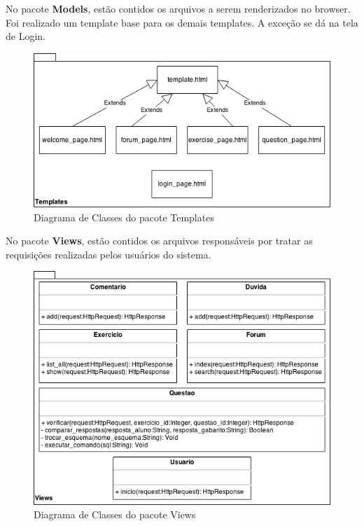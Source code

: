 \documentclass[graduacao,brazil]{ThesisPUC}
\begin{document}
No pacote \textbf{Models}, est\~{a}o contidos os arquivos a serem renderizados no browser.
Foi realizado um template base para os demais templates. A exce\c{c}\~{a}o se d\'{a}
na tela de Login.

\begin{figure}[H]
    \centering
    \includegraphics[width=\linewidth]{Imagens/DiagramaDeClasseTemplates.png}
    \caption{Diagrama de Classes do pacote Templates}
\end{figure}

No pacote \textbf{Views}, est\~{a}o contidos os arquivos respons\'{a}veis por tratar as
requisi\c{c}\~{o}es realizadas pelos usu\'{a}rios do sistema.

\begin{figure}[H]
    \centering
    \includegraphics[width=\linewidth]{Imagens/DiagramaDeClasseViews.png}
    \caption{Diagrama de Classes do pacote Views}
\end{figure}
\end{document}
